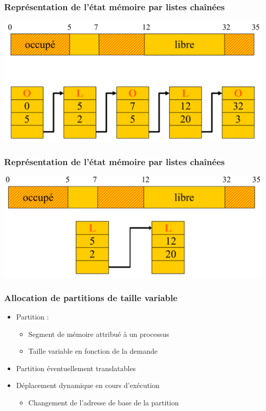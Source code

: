 \begin{frame}
\frametitle{Représentation de l'état mémoire par listes chaînées}
\includegraphics[width=\textwidth]{../illustration/memoire_principale_liste_chainee.pdf}
\end{frame}


\begin{frame}
\frametitle{Représentation de l'état mémoire par listes chaînées}
\includegraphics[width=\textwidth]{../illustration/memoire_principale_liste_chainee2.pdf}
\end{frame}


\begin{frame}
\frametitle{Allocation de partitions de taille variable}
\begin{itemize}
\item Partition :
\begin{itemize}
\item Segment de mémoire attribué à un processus
\item Taille variable en fonction de la demande
\end{itemize}
\item Partition éventuellement translatables
\item Déplacement dynamique en cours d'exécution
\begin{itemize}
\item Changement de l'adresse de base de la partition
\end{itemize}
\end{itemize}
\end{frame}


